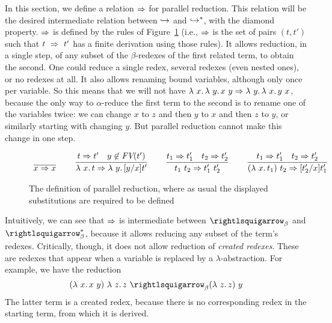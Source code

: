 In this section, we define a relation $\Pred$ for parallel
reduction\index{$\Pred$}.  This relation
will be the desired intermediate relation between $\hookrightarrow$ and
$\hookrightarrow^*$, with the diamond property.  $\Pred$ is defined by the
rules of Figure~\ref{fig:pred} (i.e., $\Pred$ is the set of pairs
$(t,t')$ such that $t\ \Rightarrow\ t'$ has a finite derivation using those
rules).  It allows reduction, in a single step, of any subset of the
$\beta$-redexes of the first related term, to obtain the second.  One
could reduce a single redex, several redexes (even nested ones), or no
redexes at all.  It also allows renaming bound variables, although
only once per variable.  So this means that we will not have
$\lam{x}{\lam{y}{x\ y}} \Pred \lam{y}{\lam{x}{y\ x}}$, because the
only way to $\alpha$-reduce the first term to the second is to rename
one of the variables twice: we can change $x$ to $z$ and then $y$ to
$x$ and then $z$ to $y$, or similarly starting with changing $y$.  But
parallel reduction cannot make this change in one step.


\newcommand{\predvar}[0]{\infer{x \Pred x}{\ }}

\newcommand{\predlam}[0]{\infer{\lam{x}{t} \Pred \lam{y}{[y/x]t'}}{t \Pred t' & y\not\in\textit{FV}(t')}}

\newcommand{\predapp}[0]{\infer{t_1\ t_2 \Pred t_1'\ t_2'}{t_1 \Pred t_1' & t_2 \Pred t_2'}}

\newcommand{\predbeta}[0]{\infer{(\lam{x}{t_1})\ t_2 \Pred [t_2'/x]t_1'}{t_1 \Pred t_1' & t_2 \Pred t_2'}}

\begin{figure}
\[
\begin{array}{lllllll}
\predvar

& \ &

\predlam

& \ &

\predapp

& \ &

\predbeta
 
\end{array}
\]
\caption{The definition of parallel reduction, where as usual the displayed substitutions are required to be defined}
\label{fig:pred}
\end{figure}

Intuitively, we can see that $\Pred$ is intermediate between $\curva_\beta$ and $\curva_\beta^*$, because
it allows reducing any subset of the term's redexes.  Critically, though, it does not allow reduction
of \emph{created redexes}.  These are redexes that appear when a variable is replaced by a $\lambda$-abstraction.  For example, we have the reduction
\[
(\lam{x}{x\ y})\ \lam{z}{z}\ \curva_\beta (\lam{z}{z})\ y
\]
\noindent The latter term is a created redex, because there is no corresponding redex in the starting term, from which it is derived.

